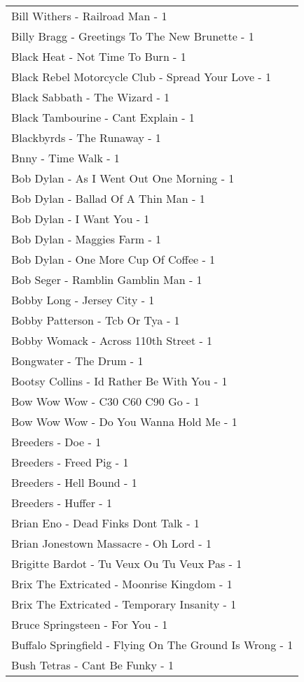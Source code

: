 \documentclass[
]{article}
\begin{document}
\begin{longtable}{l}
Bill Withers - Railroad Man - 1 \\ 
Billy Bragg - Greetings To The New Brunette - 1 \\ 
Black Heat - Not Time To Burn - 1 \\ 
Black Rebel Motorcycle Club - Spread Your Love - 1 \\ 
Black Sabbath - The Wizard - 1 \\ 
Black Tambourine - Cant Explain - 1 \\ 
Blackbyrds - The Runaway - 1 \\ 
Bnny - Time Walk - 1 \\ 
Bob Dylan - As I Went Out One Morning - 1 \\ 
Bob Dylan - Ballad Of A Thin Man - 1 \\ 
Bob Dylan - I Want You - 1 \\ 
Bob Dylan - Maggies Farm - 1 \\ 
Bob Dylan - One More Cup Of Coffee - 1 \\ 
Bob Seger - Ramblin Gamblin Man - 1 \\ 
Bobby Long - Jersey City - 1 \\ 
Bobby Patterson - Tcb Or Tya - 1 \\ 
Bobby Womack - Across 110th Street - 1 \\ 
Bongwater - The Drum - 1 \\ 
Bootsy Collins - Id Rather Be With You - 1 \\ 
Bow Wow Wow - C30 C60 C90 Go - 1 \\ 
Bow Wow Wow - Do You Wanna Hold Me - 1 \\ 
Breeders - Doe - 1 \\ 
Breeders - Freed Pig - 1 \\ 
Breeders - Hell Bound - 1 \\ 
Breeders - Huffer - 1 \\ 
Brian Eno - Dead Finks Dont Talk - 1 \\ 
Brian Jonestown Massacre - Oh Lord - 1 \\ 
Brigitte Bardot - Tu Veux Ou Tu Veux Pas - 1 \\ 
Brix The Extricated - Moonrise Kingdom - 1 \\ 
Brix The Extricated - Temporary Insanity - 1 \\ 
Bruce Springsteen - For You - 1 \\ 
Buffalo Springfield - Flying On The Ground Is Wrong - 1 \\ 
Bush Tetras - Cant Be Funky - 1 \\ 

\end{longtable}
\end{document}
